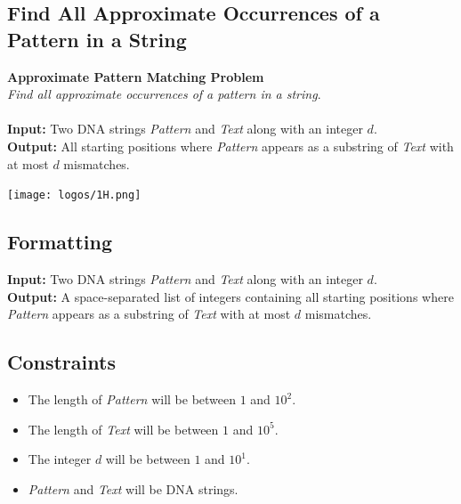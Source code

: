 \documentclass{article}
\begin{document}
\subsection{Find All Approximate Occurrences of a Pattern in a String}
\hline\vspace{5}
\noindent \textbf{Approximate Pattern Matching Problem}\\
\emph{Find all approximate occurrences of a pattern in a string}.\\ \\
\textbf{Input:} Two DNA strings \emph{Pattern} and \emph{Text} along with an integer $d$.\\
\textbf{Output:} All starting positions where \emph{Pattern} appears as a substring of \emph{Text} with at most $d$ mismatches.
\begin{center}
    \texttt{[image: logos/1H.png]} 
\end{center}
\hline\vspace{5}

\subsection*{Formatting}
\textbf{Input:} Two DNA strings \emph{Pattern} and \emph{Text} along with an integer $d$.\\
\noindent \textbf{Output:} A space-separated list of integers containing all starting positions where \emph{Pattern} appears as a substring of \emph{Text} with at most $d$ mismatches.

\subsection*{Constraints}
\begin{itemize}
    \item The length of \emph{Pattern} will be between $1$ and $10^2$.
    \item The length of \emph{Text} will be between $1$ and $10^5$.
    \item The integer $d$ will be between $1$ and $10^1$.
    \item \emph{Pattern} and \emph{Text} will be DNA strings.
\end{itemize}
\pagebreak
\end{document}
